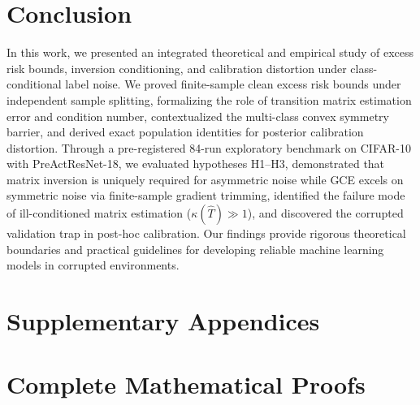 \documentclass[10pt,twocolumn]{article}
\theoremstyle{definition}
\begin{document}
\section{Conclusion}
In this work, we presented an integrated theoretical and empirical study of excess risk bounds, inversion conditioning, and calibration distortion under class-conditional label noise. We proved finite-sample clean excess risk bounds under independent sample splitting, formalizing the role of transition matrix estimation error and condition number, contextualized the multi-class convex symmetry barrier, and derived exact population identities for posterior calibration distortion. Through a pre-registered 84-run exploratory benchmark on CIFAR-10 with PreActResNet-18, we evaluated hypotheses H1--H3, demonstrated that matrix inversion is uniquely required for asymmetric noise while GCE excels on symmetric noise via finite-sample gradient trimming, identified the failure mode of ill-conditioned matrix estimation ($\kappa(\hat{T}) \gg 1$), and discovered the corrupted validation trap in post-hoc calibration. Our findings provide rigorous theoretical boundaries and practical guidelines for developing reliable machine learning models in corrupted environments.




\clearpage
\appendix
\onecolumn

\section*{Supplementary Appendices}

\section{Complete Mathematical Proofs}
\end{document}
